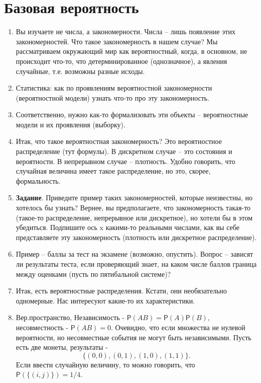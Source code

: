 
\section{Базовая вероятность}
\begin{enumerate}
\item	Вы изучаете не числа, а закономерности. Числа – лишь появление этих закономерностей. Что такое закономерность в нашем случае? Мы рассматриваем окружающий мир как вероятностный, когда, в основном, не происходит что-то, что детерминированное (однозначное), а явления случайные, т.е. возможны разные исходы.
\item	Статистика: как по проявлениям вероятностной закономерности (вероятностной модели) узнать что-то про эту закономерность.
\item	Соответственно, нужно как-то формализовать эти объекты – вероятностные модели и их проявления (выборку).
\item	Итак, что такое вероятностная закономерность? Это вероятностное распределение (тут формулы). В дискретном случае – это состояния и вероятности. В непрерывном случае – плотность. Удобно говорить, что случайная величина имеет такое распределение, но это, скорее, формальность.
\item	\textbf{Задание}. Приведите пример таких закономерностей, которые неизвестны, но хотелось бы узнать? Вернее, вы предполагаете, что закономерность такая-то (такое-то распределение, непрерывное или дискретное), но хотели бы в этом убедиться. Подпишите ось x какими-то реальными числами, как вы себе представляете эту закономерность (плотность или дискретное распределение).
\item	Пример – баллы за тест на экзамене (возможно, опустить). Вопрос – зависят ли результаты теста, если проверяющий знает, на каком числе баллов граница между оценками (пусть по пятибальной системе)?
\item	Итак, есть вероятностные распределения. Кстати, они необязательно одномерные. Нас интересуют какие-то их характеристики.
\item	Вер.пространство, Независимость - $\textsf{P}(AB) = \textsf{P}(A) \textsf{P}(B)$, несовместность - $\textsf{P}(AB) = 0$. Очевидно, что если множества не нулевой вероятности, но несовместные события не могут быть независимыми. Пусть есть две монеты, результаты -  $$\{(0,0), (0,1), (1,0), (1,1)\}.$$ Если ввести случайную величину, то можно говорить, что $\textsf{P}(\{(i,j)\}) = 1/4$.

\end{enumerate}
